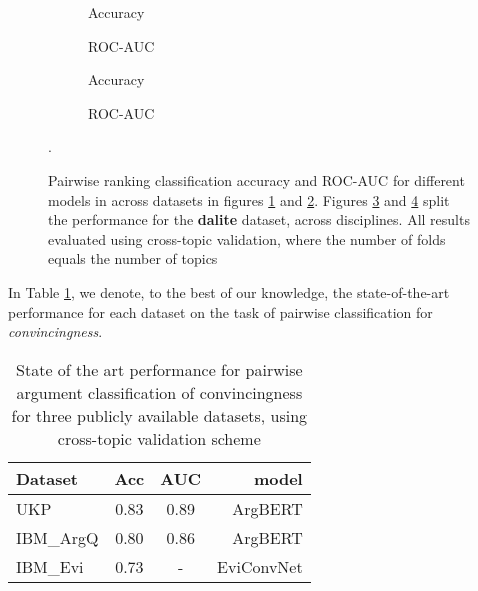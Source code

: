 \documentclass[runningheads]{llncs}
\begin{document}
\begin{figure}
	\begin{subfigure}[t]{0.5\linewidth}
		\centering
		\scalebox{0.5}{}
		\caption{Accuracy}
		\label{fig:acc_cross_topic}
	\end{subfigure}%
	\qquad
	\begin{subfigure}[t]{0.5\linewidth}
		\centering
		\scalebox{0.5}{}
		\caption{ROC-AUC}
		\label{fig:AUC_cross_topic}
	\end{subfigure}
	\begin{subfigure}[t]{0.5\linewidth}
		\centering
		\scalebox{0.5}{}
		\caption{Accuracy}
		\label{fig:acc_dalite_cross_topic}
	\end{subfigure}%
	\qquad
	\begin{subfigure}[t]{0.5\linewidth}
		\centering
		\scalebox{0.5}{}
		\caption{ROC-AUC}
		\label{fig:AUC_dalite_cross_topic}
	\end{subfigure}
	\caption{Pairwise ranking classification accuracy and ROC-AUC for 
		different models in across datasets in figures 
		\ref{fig:acc_cross_topic} 
		and \ref{fig:AUC_cross_topic}. Figures \ref{fig:acc_dalite_cross_topic} 
		and 
		\ref{fig:AUC_dalite_cross_topic} split the performance for the 
		\textbf{dalite} dataset, across disciplines. All results evaluated 
		using 
		cross-topic validation, where the number of folds equals the number of 
		topics}.
	\label{fig:performance_cross_topic}
	
\end{figure}

In Table \ref{tab:sota}, we denote, to the best of our knowledge, the 
state-of-the-art performance for each dataset on the task of pairwise  
classification for \textit{convincingness}. 

\begin{table} 
	\centering\begin{tabular}{l|*{2}{c}r}
		Dataset     & Acc & AUC & model  	   \\
		\hline
		UKP 		& 0.83 & 0.89 & ArgBERT\cite{toledo_automatic_2019}    \\
		IBM\_ArgQ   & 0.80 & 0.86 & ArgBERT\cite{toledo_automatic_2019}    \\
		IBM\_Evi    & 0.73 & - 	  & EviConvNet\cite{gleize_are_2019} \\
	\end{tabular}
	\caption{State of the art performance for pairwise argument classification 
	of 
		convincingness for three publicly available datasets, using cross-topic 
		validation scheme}
	\label{tab:sota}
\end{table}
\end{document}
